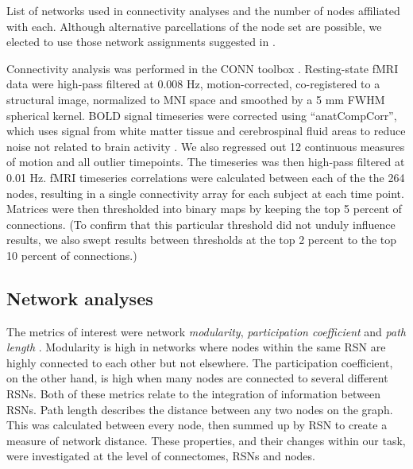 \begin{table}[t]
	\renewcommand{\tabcolsep}{0.09cm}
	\centering
	
	\caption[List of resting-state networks]{List of networks used in connectivity analyses and the number of nodes affiliated with each. Although alternative parcellations of the node set are possible, we elected to use those network assignments suggested in \citep{Power2013}.}
	\label{table:ch2-power-nodes}
\end{table}

Connectivity analysis was performed in the CONN toolbox \citep{WhitfieldGabrieli2012}. Resting-state fMRI data were high-pass filtered at 0.008 Hz, motion-corrected, co-registered to a structural image, normalized to MNI space and smoothed by a 5 mm FWHM spherical kernel. BOLD signal timeseries were corrected using ``anatCompCorr'', which uses signal from white matter tissue and cerebrospinal fluid areas to reduce noise not related to brain activity \citep{Chai2012}. We also regressed out 12 continuous measures of motion and all outlier timepoints. The timeseries was then high-pass filtered at 0.01 Hz. fMRI timeseries correlations were calculated between each of the the 264 nodes, resulting in a single connectivity array for each subject at each time point. Matrices were then thresholded into binary maps by keeping the top 5 percent of connections. (To confirm that this particular threshold did not unduly influence results, we also swept results between thresholds at the top 2 percent to the top 10 percent of connections.)

\subsection{Network analyses}

The metrics of interest were network \textit{modularity}, \textit{participation coefficient} and \textit{path length} \citep{Rubinov2010}. Modularity is high in networks where nodes within the same RSN are highly connected to each other but not elsewhere. The participation coefficient, on the other hand, is high when many nodes are connected to several different RSNs. Both of these metrics relate to the integration of information between RSNs. Path length describes the distance between any two nodes on the graph. This was calculated between every node, then summed up by RSN to create a measure of network distance. These properties, and their changes within our task, were investigated at the level of connectomes, RSNs and nodes. 

